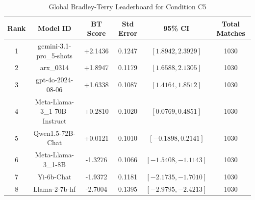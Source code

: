 \begin{table}[ht]
\centering
\caption{Global Bradley-Terry Leaderboard for Condition \textsc{C5}}
\label{tab:leaderboard_c5}
\begin{tabular}{cccccc}
\hline
\textbf{Rank} & \textbf{Model ID} & \textbf{BT Score} & \textbf{Std Error} & \textbf{95\% CI} & \textbf{Total Matches} \\
\hline
1 & gemini-3.1-pro\_5-shots & +2.1436 & 0.1247 & $[1.8942, 2.3929]$ & 1030 \\
2 & arx\_0314 & +1.8947 & 0.1179 & $[1.6588, 2.1305]$ & 1030 \\
3 & gpt-4o-2024-08-06 & +1.6338 & 0.1087 & $[1.4164, 1.8512]$ & 1030 \\
4 & Meta-Llama-3\_1-70B-Instruct & +0.2810 & 0.1020 & $[0.0769, 0.4851]$ & 1030 \\
5 & Qwen1.5-72B-Chat & +0.0121 & 0.1010 & $[-0.1898, 0.2141]$ & 1030 \\
6 & Meta-Llama-3\_1-8B & -1.3276 & 0.1066 & $[-1.5408, -1.1143]$ & 1030 \\
7 & Yi-6b-Chat & -1.9372 & 0.1181 & $[-2.1735, -1.7010]$ & 1030 \\
8 & Llama-2-7b-hf & -2.7004 & 0.1395 & $[-2.9795, -2.4213]$ & 1030 \\
\hline
\end{tabular}
\end{table}
